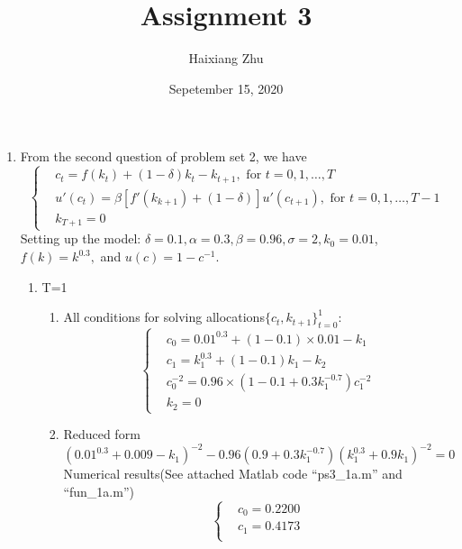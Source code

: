 \documentclass{article}
\title{Assignment 3}
\date{Sepetember 15, 2020}
\author{Haixiang Zhu}
\begin{document}
\maketitle
\begin{enumerate}
    \item From the second question of problem set 2, we have
    \begin{equation*}
        \left\{\begin{aligned}
            &c_t=f(k_t)+(1-\delta)k_t-k_{t+1},\text{ for }t=0,1,\dots,T\\
            &{u}'(c_t)=\beta[{f}'(k_{k+1})+(1-\delta)]{u}'(c_{t+1}),\text{ for }t=0,1,\dots,T-1\\
            &k_{T+1}=0
        \end{aligned}\right.
    \end{equation*}
    Setting up the model: $\delta=0.1,\alpha=0.3,\beta=0.96,\sigma=2,k_0 = 0.01$, $f(k)=k^{0.3},$ and $u(c)=1-c^{-1}$.
    \begin{enumerate}
        \item T=1
        \begin{enumerate}
            \item All conditions for solving allocations$\{c_t,k_{t+1}\}_{t=0}^1$:
            \begin{equation*}
                \left\{
                    \begin{aligned}
                    &c_0=0.01^{0.3}+(1-0.1)\times0.01-k_1\\
                    &c_1=k_1^{0.3}+(1-0.1)k_1-k_2\\
                    &c_0^{-2}=0.96\times(1-0.1+0.3k_1^{-0.7})c_1^{-2}\\
                    &k_2=0
                    \end{aligned}
                \right.
            \end{equation*}
            \item Reduced form
            \begin{equation*}
                (0.01^{0.3}+0.009-k_1)^{-2}-0.96(0.9+0.3k_1^{-0.7})(k_1^{0.3}+0.9k_1)^{-2}=0
            \end{equation*}
            Numerical results(See attached Matlab code ``ps3\_1a.m'' and ``fun\_1a.m'')
            \begin{equation*}
                \left\{
                    \begin{aligned}
                    &c_0=0.2200\\
                    &c_1=0.4173\\

\end{aligned}
\end{equation*}
\end{enumerate}
\end{enumerate}
\end{enumerate}
\end{document}
